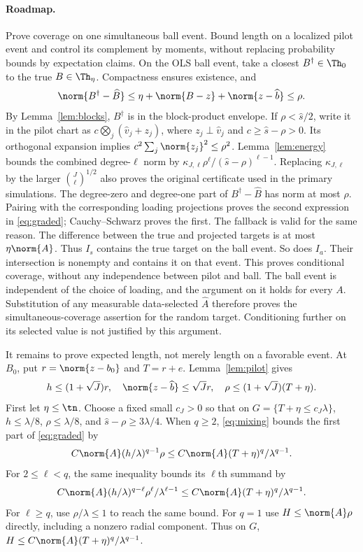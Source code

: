 \paragraph{Roadmap.} Prove coverage on one simultaneous ball event. Bound length on a localized pilot event and control its complement by moments, without replacing probability bounds by expectation claims.
On the OLS ball event, take a closest $B^\dagger\in\Th_0$ to the true $B\in\Th_\eta$. Compactness ensures existence, and
\[
 \norm{B^\dagger-\widehat B}\le\eta+\norm{B-z}+\norm{z-\widehat b}\le\rho.
\]
By Lemma~\ref{lem:blocks}, $B^\dagger$ is in the block-product envelope. If $\rho<\widehat s/2$, write it in the pilot chart as $c\bigotimes_j(\widehat v_j+z_j)$, where $z_j\perp\widehat v_j$ and $c\ge\widehat s-\rho>0$. Its orthogonal expansion implies $c^2\sum_j\norm{z_j}^2\le\rho^2$. Lemma~\ref{lem:energy} bounds the combined degree-$\ell$ norm by $\kappa_{J,\ell}\rho^\ell/(\widehat s-\rho)^{\ell-1}$. Replacing $\kappa_{J,\ell}$ by the larger $\binom J\ell^{1/2}$ also proves the original certificate used in the primary simulations. The degree-zero and degree-one part of $B^\dagger-\widehat B$ has norm at most $\rho$. Pairing with the corresponding loading projections proves the second expression in \eqref{eq:graded}; Cauchy--Schwarz proves the first. The fallback is valid for the same reason. The difference between the true and projected targets is at most $\eta\norm{A}$. Thus $I_s$ contains the true target on the ball event. So does $I_a$. Their intersection is nonempty and contains it on that event. This proves conditional coverage, without any independence between pilot and ball. The ball event is independent of the choice of loading, and the argument on it holds for every $A$. Substitution of any measurable data-selected $\widehat A$ therefore proves the simultaneous-coverage assertion for the random target. Conditioning further on its selected value is not justified by this argument.

It remains to prove expected length, not merely length on a favorable event. At $B_0$, put $r=\norm{z-b_0}$ and $T=r+e$. Lemma~\ref{lem:pilot} gives
\[
 h\le(1+\sqrt J)r,\quad \norm{z-\widehat b}\le\sqrt J r,
 \quad\rho\le(1+\sqrt J)(T+\eta).
\]
First let $\eta\le\tn$. Choose a fixed small $c_J>0$ so that on $G=\{T+\eta\le c_J\lambda\}$, $h\le\lambda/8$, $\rho\le\lambda/8$, and $\widehat s-\rho\ge3\lambda/4$. When $q\ge2$, \eqref{eq:mixing} bounds the first part of \eqref{eq:graded} by
\[
 C\norm{A}(h/\lambda)^{q-1}\rho
 \le C\norm{A}(T+\eta)^q/\lambda^{q-1}.
\]
For $2\le\ell<q$, the same inequality bounds its $\ell$th summand by
\[
 C\norm{A}(h/\lambda)^{q-\ell}\rho^\ell/\lambda^{\ell-1}
 \le C\norm{A}(T+\eta)^q/\lambda^{q-1}.
\]
For $\ell\ge q$, use $\rho/\lambda\le1$ to reach the same bound. For $q=1$ use $H\le\norm{A}\rho$ directly, including a nonzero radial component. Thus on $G$, $H\le C\norm{A}(T+\eta)^q/\lambda^{q-1}$.

